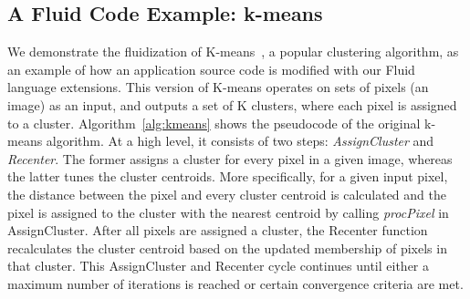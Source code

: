 


  
\subsection{A Fluid Code Example: k-means}
\label{ssec:lan_examp}
We demonstrate the fluidization of K-means~\cite{kmeanspaper}, a popular clustering algorithm, as an example of how an application source code is modified with our Fluid language extensions. This version of K-means operates on sets of pixels (an image) as an input, and outputs a set of K clusters, where each pixel is assigned to a cluster. Algorithm~\ref{alg:kmeans} shows the pseudocode of the original k-means algorithm. At a high level, it consists of two steps: {\it AssignCluster} and {\it Recenter}. The former assigns a cluster for every pixel in a given image, whereas the latter tunes the cluster centroids. More specifically, for a given input pixel, the distance between the pixel and every cluster centroid is calculated and the pixel is assigned to the cluster with the nearest centroid by calling \textit{procPixel} in AssignCluster. After all pixels are assigned a cluster, the Recenter function recalculates the cluster centroid based on the updated membership of pixels in that cluster. This AssignCluster and Recenter cycle continues until either a maximum number of iterations is reached or certain convergence criteria are met. 

